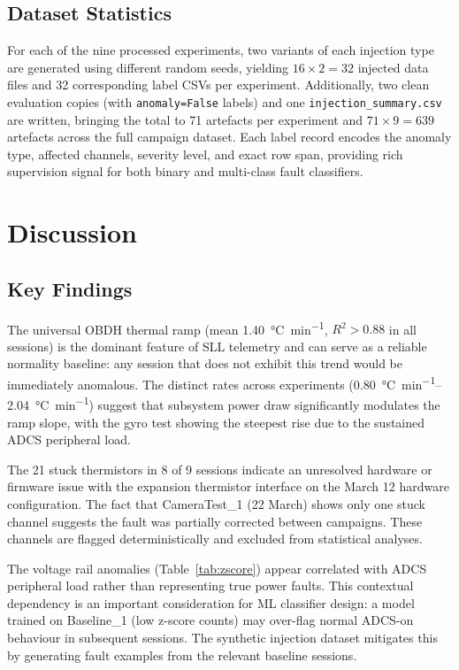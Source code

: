 \documentclass[conference]{IEEEtran}
\begin{document}
\subsection{Dataset Statistics}

For each of the nine processed experiments, two variants of each
injection type are generated using different random seeds, yielding
$16 \times 2 = 32$ injected data files and 32 corresponding label
CSVs per experiment.  Additionally, two clean evaluation copies
(with \texttt{anomaly=False} labels) and one \texttt{injection\_summary.csv}
are written, bringing the total to 71 artefacts per experiment and
$71 \times 9 = 639$ artefacts across the full campaign dataset.
Each label record encodes the anomaly type, affected channels,
severity level, and exact row span, providing rich supervision signal
for both binary and multi-class fault classifiers.

\section{Discussion}
\label{sec:discussion}

\subsection{Key Findings}

The universal OBDH thermal ramp (mean
\SI{1.40}{\celsius\per\minute}, $R^2 > 0.88$ in all sessions) is the
dominant feature of SLL telemetry and can serve as a reliable
normality baseline: any session that does not exhibit this trend would
be immediately anomalous.  The distinct rates across experiments
(\SIrange{0.80}{2.04}{\celsius\per\minute}) suggest that subsystem
power draw significantly modulates the ramp slope, with the gyro test
showing the steepest rise due to the sustained ADCS peripheral load.

The 21 stuck thermistors in 8 of 9 sessions indicate an unresolved
hardware or firmware issue with the expansion thermistor interface on
the March 12 hardware configuration.  The fact that CameraTest\_1
(22 March) shows only one stuck channel suggests the fault was
partially corrected between campaigns.  These channels are flagged
deterministically and excluded from statistical analyses.

The voltage rail anomalies (Table~\ref{tab:zscore}) appear correlated
with ADCS peripheral load rather than representing true power faults.
This contextual dependency is an important consideration for ML
classifier design: a model trained on Baseline\_1 (low z-score counts)
may over-flag normal ADCS-on behaviour in subsequent sessions.  The
synthetic injection dataset mitigates this by generating fault
examples from the relevant baseline sessions.
\end{document}
